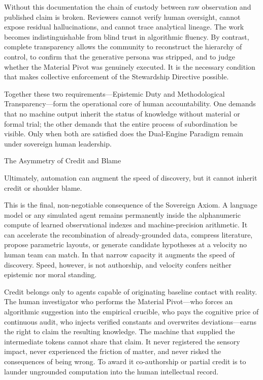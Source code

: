 Without this documentation the chain of custody between raw observation and published claim is broken. Reviewers cannot verify human oversight, cannot expose residual hallucinations, and cannot trace analytical lineage. The work becomes indistinguishable from blind trust in algorithmic fluency. By contrast, complete transparency allows the community to reconstruct the hierarchy of control, to confirm that the generative persona was stripped, and to judge whether the Material Pivot was genuinely executed. It is the necessary condition that makes collective enforcement of the Stewardship Directive possible.

Together these two requirements—Epistemic Duty and Methodological Transparency—form the operational core of human accountability. One demands that no machine output inherit the status of knowledge without material or formal trial; the other demands that the entire process of subordination be visible. Only when both are satisfied does the Dual-Engine Paradigm remain under sovereign human leadership.

The Asymmetry of Credit and Blame

Ultimately, automation can augment the speed of discovery, but it cannot inherit credit or shoulder blame.

This is the final, non-negotiable consequence of the Sovereign Axiom. A language model or any simulated agent remains permanently inside the alphanumeric compute of learned observational indexes and machine-precision arithmetic. It can accelerate the recombination of already-grounded data, compress literature, propose parametric layouts, or generate candidate hypotheses at a velocity no human team can match. In that narrow capacity it augments the speed of discovery. Speed, however, is not authorship, and velocity confers neither epistemic nor moral standing.

Credit belongs only to agents capable of originating baseline contact with reality. The human investigator who performs the Material Pivot—who forces an algorithmic suggestion into the empirical crucible, who pays the cognitive price of continuous audit, who injects verified constants and overwrites deviations—earns the right to claim the resulting knowledge. The machine that supplied the intermediate tokens cannot share that claim. It never registered the sensory impact, never experienced the friction of matter, and never risked the consequences of being wrong. To award it co-authorship or partial credit is to launder ungrounded computation into the human intellectual record.

